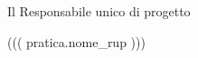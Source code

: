 \begin{flushright}
\begin{minipage}[c]{8cm}
\begin{center}
Il Responsabile unico di progetto

((( pratica.nome_rup )))

\end{center}
\end{minipage}
\end{flushright}

